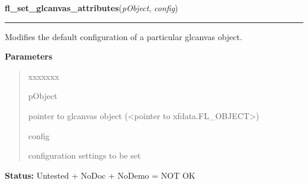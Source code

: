 \hspace{.8\funcindent}\begin{boxedminipage}{\funcwidth}

    \raggedright \textbf{fl\_set\_glcanvas\_attributes}(\textit{pObject}, \textit{config})

    \vspace{-1.5ex}

    \rule{\textwidth}{0.5\fboxrule}
\setlength{\parskip}{2ex}
    Modifies the default configuration of a particular glcanvas object.

\setlength{\parskip}{1ex}
      \textbf{Parameters}
      \vspace{-1ex}

      \begin{quote}
        \begin{Ventry}{xxxxxxx}

          \item[pObject]

          pointer to glcanvas object ({\textless}pointer to 
          xfdata.FL\_OBJECT{\textgreater})

          \item[config]

          configuration settings to be set

        \end{Ventry}

      \end{quote}

\textbf{Status:} Untested + NoDoc + NoDemo = NOT OK



    \end{boxedminipage}

    \label{xformslib:library:fl_get_glcanvas_attributes}

    \vspace{0.5ex}

